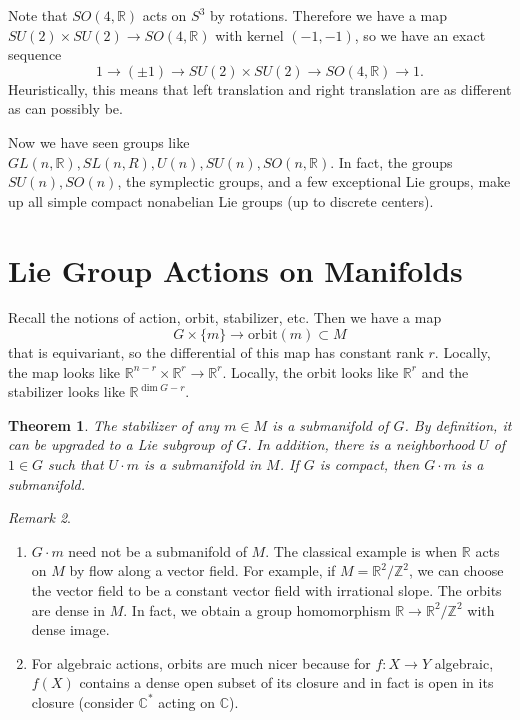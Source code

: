 \documentclass[leqno, openany]{memoir}
\newtheorem{thm}{Theorem}[section]
\theoremstyle{definition}
\theoremstyle{remark}
\newtheorem{rmk}[thm]{Remark}
\theoremstyle{plain}
\theoremstyle{definition}
\theoremstyle{remark}
\newcommand{\R}{\mathbb{R}}
\newcommand{\C}{\mathbb{C}}
\newcommand{\Z}{\mathbb{Z}}
\newcommand{\mr}[1]{\mathrm{#1}}
\begin{document}
Note that $SO(4,\R)$ acts on $S^3$ by rotations. Therefore we have a map $SU(2)
\times SU(2) \to SO(4, \R)$ with kernel $(-1, -1)$, so we have an exact
sequence \[ 1 \to (\pm 1) \to SU(2) \times SU(2) \to SO(4,\R) \to 1. \]
Heuristically, this means that left translation and right translation are as
different as can possibly be.

Now we have seen groups like $GL(n, \R), SL(n,R), U(n), SU(n), SO(n,\R)$. In
fact, the groups $SU(n), SO(n)$, the symplectic groups, and a few exceptional
Lie groups, make up all simple compact nonabelian Lie groups (up to discrete
centers).

\section{Lie Group Actions on Manifolds}%
\label{sec:lie_group_actions_on_manifolds}

Recall the notions of action, orbit, stabilizer, etc. Then we have a map \[ G
\times \{m \} \to \mr{orbit}(m) \subset M \] that is equivariant, so the
differential of this map has constant rank $r$. Locally, the map looks like
$\R^{n-r} \times \R^r \to \R^r$. Locally, the orbit looks like $\R^r$ and the
stabilizer looks like $\R^{\dim G - r}$.

\begin{thm} The stabilizer of any $m \in M$ is a submanifold of $G$. By
    definition, it can be upgraded to a Lie subgroup of $G$. In addition, there
    is a neighborhood $U$ of $1 \in G$ such that $U \cdot m$ is a submanifold
    in $M$. If $G$ is compact, then $G \cdot m$ is a submanifold.  \end{thm}

\begin{rmk} \begin{enumerate} \item $G \cdot m$ need not be a submanifold of
    $M$. The classical example is when $\R$ acts on $M$ by flow along a vector
    field. For example, if $M = \R^2 / \Z^2$, we can choose the vector field to
    be a constant vector field with irrational slope. The orbits are dense in
    $M$. In fact, we obtain a group homomorphism $\R \to \R^2 / \Z^2$ with
    dense image.  \item For algebraic actions, orbits are much nicer because
    for $f: X \to Y$ algebraic, $f(X)$ contains a dense open subset of its
    closure and in fact is open in its closure (consider $\C^*$ acting on
    $\C$).  \end{enumerate} \end{rmk}
\end{document}

